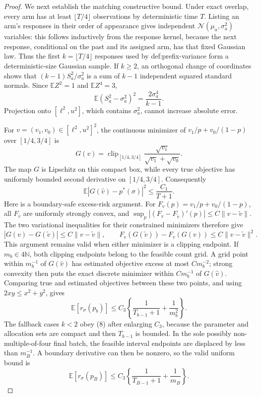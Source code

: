 \documentclass{article}
\begin{document}
\begin{proof}
We next establish the matching constructive bound.  Under exact overlap, every arm has at least \(\lfloor T/4\rfloor\) observations by deterministic time \(T\).  Listing an arm's responses in their order of appearance gives independent \(\mathcal N(\mu_a,\sigma_a^2)\) variables: this follows inductively from the response kernel, because the next response, conditional on the past and its assigned arm, has that fixed Gaussian law.  Thus the first \(k=\lfloor T/4\rfloor\) responses used by def:prefix-variance form a deterministic-size Gaussian sample.  If \(k\geq2\), an orthogonal change of coordinates shows that
\((k-1)S_a^2/\sigma_a^2\) is a sum of \(k-1\) independent squared standard normals.  Since \(\mathbb E Z^2=1\) and \(\mathbb E Z^4=3\),
\[
\mathbb E(S_a^2-\sigma_a^2)^2=\frac{2\sigma_a^4}{k-1}.
\]
Projection onto \([\ell^2,u^2]\), which contains \(\sigma_a^2\), cannot increase absolute error.

For \(v=(v_1,v_0)\in[\ell^2,u^2]^2\), the continuous minimizer of
\(v_1/p+v_0/(1-p)\) over \([1/4,3/4]\) is
\[
G(v)=\operatorname{clip}_{[1/4,3/4]}
 \frac{\sqrt{v_1}}{\sqrt{v_1}+\sqrt{v_0}}.
\]
The map \(G\) is Lipschitz on this compact box, while every true objective has uniformly bounded second derivative on \([1/4,3/4]\).  Consequently
\[
\mathbb E|G(\widehat v)-p^*(\sigma)|^2\leq \frac{C_1}{T+1}. \tag{7}
\]
Here is a boundary-safe excess-risk argument.  For \(F_v(p)=v_1/p+v_0/(1-p)\), all
\(F_v\) are uniformly strongly convex, and
\(\sup_p|(F_v-F_{\widetilde v})'(p)|\leq C\|v-\widetilde v\|\).
The two variational inequalities for their constrained minimizers therefore give
\[
|G(v)-G(\widetilde v)|\leq C\|v-\widetilde v\|,
\qquad
F_v(G(\widetilde v))-F_v(G(v))\leq C\|v-\widetilde v\|^2.
\]
This argument remains valid when either minimizer is a clipping endpoint.  If
\(m_b\in4\mathbb N\), both clipping endpoints belong to the feasible count grid.  A grid point within \(m_b^{-1}\) of \(G(\widehat v)\) has estimated objective excess at most
\(C m_b^{-2}\); strong convexity then puts the exact discrete minimizer within
\(C m_b^{-1}\) of \(G(\widehat v)\).  Comparing true and estimated objectives between these two points, and using \(2xy\leq x^2+y^2\), gives
\[
\mathbb E[r_\sigma(p_b)]
\leq C_3\left\{\frac1{T_{b-1}+1}+\frac1{m_b^2}\right\}.   \tag{8}
\]
The fallback cases \(k<2\) obey (8) after enlarging \(C_3\), because the parameter and allocation sets are compact and then \(T_{b-1}\) is bounded.  In the sole possibly non-multiple-of-four final batch, the feasible interval endpoints are displaced by less than \(m_B^{-1}\).  A boundary derivative can then be nonzero, so the valid uniform bound is
\[
\mathbb E[r_\sigma(p_B)]
\leq C_3\left\{\frac1{T_{B-1}+1}+\frac1{m_B}\right\}.      \tag{9}
\]


\end{proof}
\end{document}
